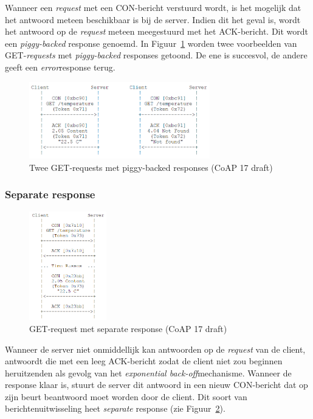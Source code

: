 Wanneer een \textit{request} met een CON-bericht verstuurd wordt, is het mogelijk dat het antwoord meteen beschikbaar is bij de server. Indien dit het geval is, wordt het antwoord op de \textit{request} meteen meegestuurd met het ACK-bericht. Dit wordt een \textit{piggy-backed} response genoemd. In Figuur~\ref{fig:CoAPPiggyBacked} worden twee voorbeelden van GET-\textit{requests} met \textit{piggy-backed} responses getoond. De ene is succesvol, de andere geeft een \textit{error}response terug.
\begin{figure}[h]
\vspace{10pt}
\centering
\includegraphics[width=0.7\textwidth]{fig/CoAPPiggyBacked}
\caption{Twee GET-requests met piggy-backed responses (CoAP 17 draft)}
\label{fig:CoAPPiggyBacked}
\vspace{-20pt}
\end{figure}

\newpage
\subsubsection{Separate response} \label{separate}

\begin{figure}
\vspace{-40pt}
\includegraphics[width=0.3\textwidth]{fig/CoAPSeperateResponse}
\vspace{-30pt}
\caption{GET-request met separate response (CoAP 17 draft)}
\label{fig:SeparateResponse}
\vspace{-100pt}
\end{figure}
Wanneer de server niet onmiddellijk kan antwoorden op de \textit{request} van de client, antwoordt die met een leeg ACK-bericht zodat de client niet zou beginnen heruitzenden als gevolg van het \textit{exponential back-off}mechanisme. Wanneer de response klaar is, stuurt de server dit antwoord in een nieuw CON-bericht dat op zijn beurt beantwoord moet worden door de client. Dit soort van berichtenuitwisseling heet \textit{separate} response (zie Figuur~\ref{fig:SeparateResponse}).
\\
\\
\\

